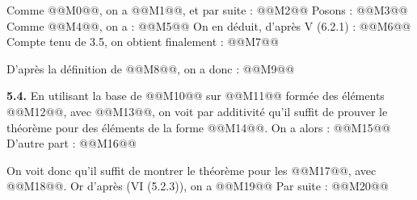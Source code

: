 
Comme @@M0@@, on a @@M1@@, et par suite :
@@M2@@
Posons :
@@M3@@
Comme @@M4@@, on a :
@@M5@@
On en déduit, d'après V (6.2.1) :
@@M6@@
Compte tenu de 3.5, on obtient finalement :
@@M7@@

D'après la définition de @@M8@@, on a donc :
@@M9@@

\textbf{5.4.} En utilisant la base de @@M10@@ sur @@M11@@ formée des éléments @@M12@@, avec @@M13@@, on voit par additivité qu'il suffit de prouver le théorème pour des éléments de la forme @@M14@@. On a alors :
@@M15@@
D'autre part :
@@M16@@

On voit donc qu'il suffit de montrer le théorème pour les @@M17@@, avec @@M18@@. Or d'après (VI (5.2.3)), on a
@@M19@@
Par suite :
@@M20@@

